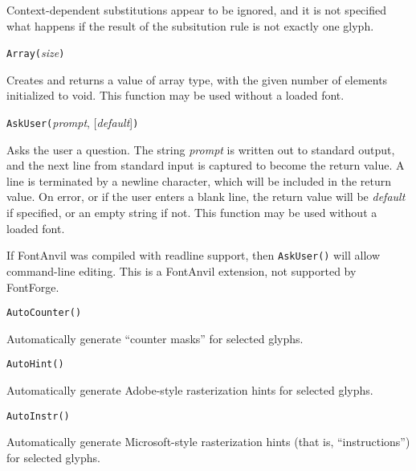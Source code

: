 Context-dependent substitutions appear to be ignored, and it is not
specified what happens if the result of the subsitution rule is not exactly
one glyph.



\texttt{Array(}\textit{size}\texttt{)}

Creates and returns a value of array type, with the given number of
elements initialized to void.
This function may be used without a loaded font.



\texttt{AskUser(}\textit{prompt}, [\textit{default}]\texttt{)}

Asks the user a question.  The string \textit{prompt} is written out to
standard output, and the next line from standard input is captured to become
the return value.  A line is terminated by a newline character, which will
be included in the return value.  On error, or if the user enters a blank
line, the return value will be \textit{default} if specified, or an empty
string if not.
This function may be used without a loaded font.

If \FFdiff FontAnvil was compiled with readline support, then
\texttt{AskUser()} will allow command-line editing.  This is a
FontAnvil extension, not supported by FontForge.



\texttt{AutoCounter(}\texttt{)}

Automatically generate ``counter masks'' for selected glyphs.



\texttt{AutoHint()}

Automatically generate Adobe-style rasterization hints for selected
glyphs.



\texttt{AutoInstr()}

Automatically generate Microsoft-style rasterization hints (that is,
``instructions'') for selected glyphs.



